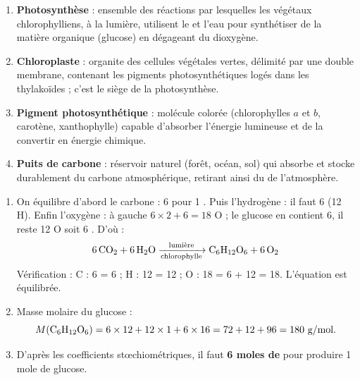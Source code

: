\documentclass[11pt]{article}
\begin{document}
\begin{corrige}
\begin{enumerate}
\item \textbf{Photosynthèse} : ensemble des réactions par lesquelles les végétaux chlorophylliens, à la lumière, utilisent le  et l'eau pour synthétiser de la matière organique (glucose) en dégageant du dioxygène.
\item \textbf{Chloroplaste} : organite des cellules végétales vertes, délimité par une double membrane, contenant les pigments photosynthétiques logés dans les thylakoïdes ; c'est le siège de la photosynthèse.
\item \textbf{Pigment photosynthétique} : molécule colorée (chlorophylles $a$ et $b$, carotène, xanthophylle) capable d'absorber l'énergie lumineuse et de la convertir en énergie chimique.
\item \textbf{Puits de carbone} : réservoir naturel (forêt, océan, sol) qui absorbe et stocke durablement du carbone atmosphérique, retirant ainsi du  de l'atmosphère.
\end{enumerate}
\end{corrige}

\begin{corrige}
\begin{enumerate}
\item On équilibre d'abord le carbone : 6  pour 1 . Puis l'hydrogène : il faut 6  (12 H). Enfin l'oxygène : à gauche $6\times 2 + 6 = 18$ O ; le glucose en contient 6, il reste 12 O soit 6 . D'où :
\[ \ce{6CO2 + 6H2O ->[$\text{lumière}$][\text{chlorophylle}] C6H12O6 + 6O2} \]
Vérification : C : 6 = 6 ; H : 12 = 12 ; O : 18 = 6 + 12 = 18. L'équation est équilibrée.
\item Masse molaire du glucose :
\[ M(\ce{C6H12O6}) = 6\times 12 + 12\times 1 + 6\times 16 = 72 + 12 + 96 = 180 \text{ g/mol}. \]
\item D'après les coefficients stœchiométriques, il faut \textbf{6 moles de } pour produire 1 mole de glucose.
\end{enumerate}
\end{corrige}
\end{document}
